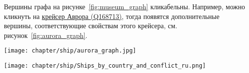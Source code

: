 Вершины графа на рисунке~\ref{fig:museum_graph} кликабельны. Например, можно кликнуть на \href{https://www.wikidata.org/wiki/Q168713}{крейсер Аврора (Q168713)}, тогда появятся дополнительные вершины, соответствующие свойствам этого крейсера, см. рисунок~\ref{fig:aurora_graph}.

\begin{figure*}[ht]
  \centering
  \texttt{[image: chapter/ship/aurora\_graph.jpg]}
  \caption[Граф свойств Авроры]{Граф свойств \href{https://www.wikidata.org/wiki/Q168713}{крейсера Аврора (Q168713)}.}%
  \label{fig:aurora_graph}%
\end{figure*}


\begin{figure*}[ht]
  \texttt{[image: chapter/ship/Ships\_by\_country\_and\_conflict\_ru.png]}
  \caption[Список кораблей и конфликтов, в которых они участвовали]{Фрагмент cписка кораблей, связанных с Россией и участвовавших в военных конфликтах, 2017 год. Из списка видно, что больше большая часть кораблей связаны с Россией и СССР, а также со Второй мировой или Великой Отечественной войнами.}%
  \label{fig:ships_by_country_and_conflict}%
\end{figure*}
